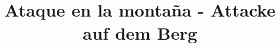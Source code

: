 \documentclass[a4paper, pagesize, DIV=15, fontsize=8pt, parskip=half, twoside, BCOR=5mm]{scrartcl}
\begin{document}
\title{Ataque en la montaña - Attacke auf dem Berg}
\date{}

\maketitle

\newcommand{\rn}[1]{\Rnode{#1}}
\newcommand{\rl}[2]{\ncline[linestyle=solid,arrows=->,nodesepA=0.5pt,linecolor=gray, strokeopacity=0.5]{#1}{#2}}



\begin{paracol}{2}

\end{paracol}
\end{document}
